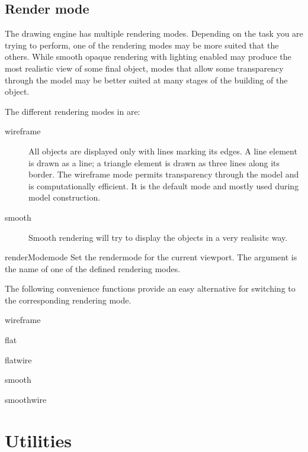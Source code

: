 \subsection{Render mode}

The \pyformex drawing engine has multiple rendering modes. Depending on the task you are trying to perform, one of the rendering modes may be more suited that the others. While smooth opaque rendering with lighting enabled may produce the most realistic view of some final object, modes that allow some transparency through the model may be better suited at many stages of the building of the object.

The different rendering modes in \pyformex are:
\begin{description}
  \item[wireframe] All objects are displayed only with lines marking its edges. A line element is drawn as a line; a triangle element is drawn as three lines along its border. The wireframe mode permits transparency through the model and is computationally efficient. It is the default mode and mostly used during model construction.
  \item[smooth] Smooth rendering will try to display the objects in a very realisitc way. 
\end{description}


\begin{funcdesc}{renderMode}{mode}
Set the rendermode for the current viewport. The argument is the name of one of the defined rendering modes.
\end{funcdesc}

The following convenience functions provide an easy alternative for switching to the corresponding rendering mode.
    
\begin{funcdesc}{wireframe}{}
\end{funcdesc}
\begin{funcdesc}{flat}{}
\end{funcdesc}
\begin{funcdesc}{flatwire}{}
\end{funcdesc}
\begin{funcdesc}{smooth}{}
\end{funcdesc}
\begin{funcdesc}{smoothwire}{}
\end{funcdesc}



\section{Utilities}
\label{sec:utilities}

